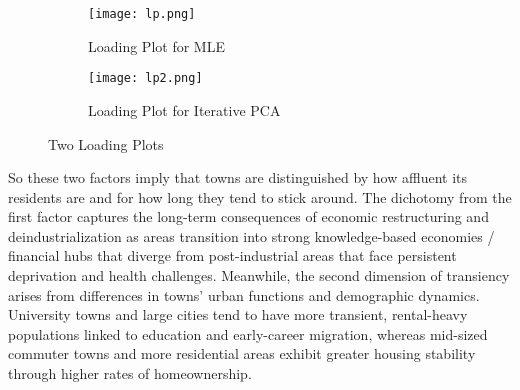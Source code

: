 \documentclass[12pt]{article}
\begin{document}
\begin{table}[htbp]
\centering
{}
\caption{Comparison of factor loadings from Iterative PCA and Maximum Likelihood Estimation (MLE)}
\label{tab:factor_loadings}
\end{table}

\begin{figure}[htbp]
    \centering
    \begin{subfigure}[t]{0.48\textwidth}
        \centering
        \texttt{[image: lp.png]}
        \caption{Loading Plot for MLE}
        \label{fig:lp1}
    \end{subfigure}
    \hfill
    \begin{subfigure}[t]{0.48\textwidth}
        \centering
        \texttt{[image: lp2.png]}
        \caption{Loading Plot for Iterative PCA}
        \label{fig:lp2}
    \end{subfigure}
    \caption{Two Loading Plots}
    \label{fig:lps}
\end{figure}

So these two factors imply that towns are distinguished by how affluent its residents are and for how long they tend to stick around. The dichotomy from the first factor captures the long-term consequences of economic restructuring and deindustrialization as areas transition into strong knowledge-based economies / financial hubs that diverge from post-industrial areas that face persistent deprivation and health challenges. Meanwhile, the second dimension of transiency arises from differences in towns' urban functions and demographic dynamics. University towns and large cities tend to have more transient, rental-heavy populations linked to education and early-career migration, whereas mid-sized commuter towns and more residential areas exhibit greater housing stability through higher rates of homeownership.
\end{document}
